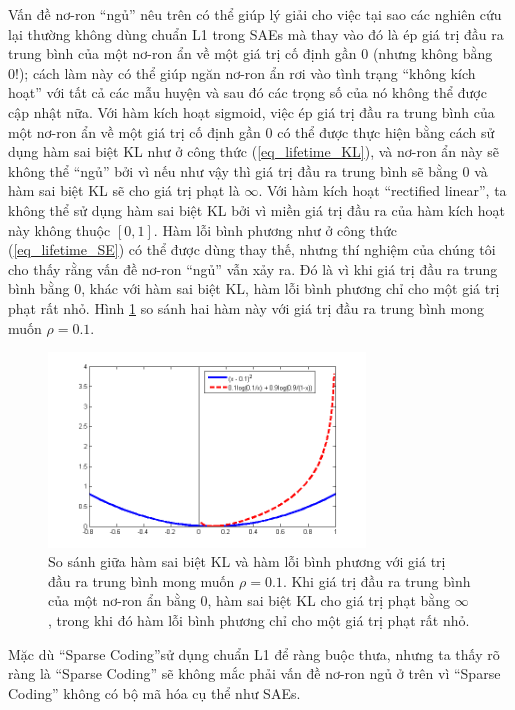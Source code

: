 Vấn đề nơ-ron ``ngủ'' nêu trên có thể giúp lý giải cho việc tại sao các nghiên cứu lại thường không dùng chuẩn L1 trong SAEs mà thay vào đó là ép giá trị đầu ra trung bình của một nơ-ron ẩn về một giá trị cố định gần 0 (nhưng không bằng 0!); cách làm này có thể giúp ngăn nơ-ron ẩn rơi vào tình trạng ``không kích hoạt'' với tất cả các mẫu huyện và sau đó các trọng số của nó không thể được cập nhật nữa. Với hàm kích hoạt sigmoid, việc ép giá trị đầu ra trung bình của một nơ-ron ẩn về một giá trị cố định gần 0 có thể được thực hiện bằng cách sử dụng hàm sai biệt KL như ở công thức (\ref{eq_lifetime_KL}), và nơ-ron ẩn này sẽ không thể ``ngủ'' bởi vì nếu như vậy thì giá trị đầu ra trung bình sẽ bằng 0 và hàm sai biệt KL sẽ cho giá trị phạt là $\infty$. Với hàm kích hoạt ``rectified linear'', ta không thể sử dụng hàm sai biệt KL bởi vì miền giá trị đầu ra của hàm kích hoạt này không thuộc $[0, 1]$. Hàm lỗi bình phương như ở công thức (\ref{eq_lifetime_SE}) có thể được dùng thay thế, nhưng thí nghiệm của chúng tôi cho thấy rằng vấn đề nơ-ron ``ngủ'' vẫn xảy ra. Đó là vì khi giá trị đầu ra trung bình bằng 0, khác với hàm sai biệt KL, hàm lỗi bình phương chỉ cho một giá trị phạt rất nhỏ. Hình \ref{fig_KLvsSE} so sánh hai hàm này với giá trị đầu ra trung bình mong muốn $\rho = 0.1$.
\begin{figure}
	\centering
	\includegraphics[width=0.75\textwidth]{KLvsSE}
	\caption[So sánh giữa hàm sai biệt KL và hàm lỗi bình phương]{So sánh giữa hàm sai biệt KL và hàm lỗi bình phương với giá trị đầu ra trung bình mong muốn $\rho = 0.1$. Khi giá trị đầu ra trung bình của một nơ-ron ẩn bằng 0, hàm sai biệt KL cho giá trị phạt bằng $\infty$, trong khi đó hàm lỗi bình phương chỉ cho một giá trị phạt rất nhỏ.}
	\label{fig_KLvsSE}
\end{figure}

Mặc dù ``Sparse Coding''sử dụng chuẩn L1 để ràng buộc thưa, nhưng ta thấy rõ ràng là ``Sparse Coding'' sẽ không mắc phải vấn đề nơ-ron ngủ ở trên vì ``Sparse Coding'' không có bộ mã hóa cụ thể như SAEs.
